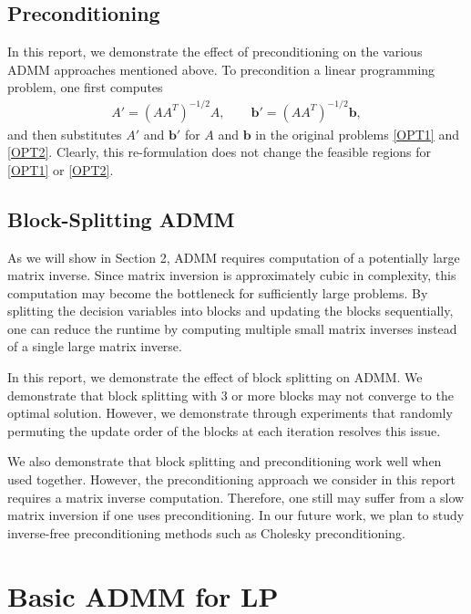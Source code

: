 \documentclass{article}
\begin{document}
\vspace{0.1in}
\subsection*{Preconditioning}
In this report, we demonstrate the effect of preconditioning on the various ADMM approaches mentioned above. To precondition a linear programming problem, one first computes 
\begin{align}
A' = (AA^T )^{-1/2}A , \quad \quad \mathbf{b}' =(AA^T )^{-1/2}\mathbf{b},
\end{align}
and then substitutes $A'$ and $\mathbf{b}'$ for $A$ and $\mathbf{b}$ in the original problems \eqref{OPT1} and \eqref{OPT2}. Clearly, this re-formulation does not change the feasible regions for  \eqref{OPT1} or \eqref{OPT2}. 

\vspace{0.1in}
\vspace{0.1in}
\subsection*{Block-Splitting ADMM}
As we will show in Section 2, ADMM requires computation of a potentially large matrix inverse. Since matrix inversion is approximately cubic in complexity, this computation may become the bottleneck for sufficiently large problems. By splitting the decision variables into blocks and updating the blocks sequentially, one can reduce the runtime by computing multiple small matrix inverses instead of a single large matrix inverse.

In this report, we demonstrate the effect of block splitting on ADMM. We demonstrate that block splitting with 3 or more blocks may not converge to the optimal solution. However, we demonstrate through experiments that randomly permuting the update order of the blocks at each iteration resolves this issue.

We also demonstrate that block splitting and preconditioning work well when used together. However, the preconditioning approach we consider in this report requires a matrix inverse computation. Therefore, one still may suffer from a slow matrix inversion if one uses preconditioning. In our future work, we plan to study inverse-free preconditioning methods such as Cholesky preconditioning.

\vspace{0.5in}
\section{Basic ADMM for LP}
\vspace{0.1in}
\end{document}
